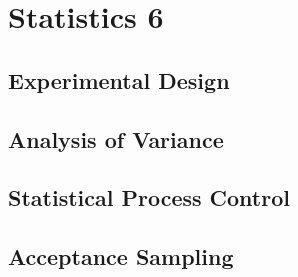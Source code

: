 \chapter*{Statistics 6}

\newpage
\section{Experimental Design}

\newpage
\section{Analysis of Variance}

\newpage
\section{Statistical Process Control}

\newpage
\section{Acceptance Sampling}
